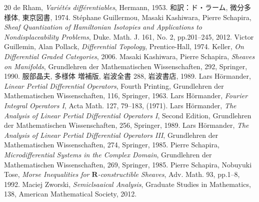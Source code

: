 \documentclass[leqno, 10pt, a4paper, dvipdfmx]{jsarticle}
\theoremstyle{definition}
\newcommand{\rr}{\mathbf{R}}
\numberwithin{equation}{section}
\theoremstyle{mystyle}
\begin{document}
\begin{thebibliography}{20} 
  de Rham, \textit{Vari\'et\'es diff\'erentiables}, Hermann, 1953.
  和訳：ド・ラーム, 微分多様体, 東京図書, 1974.
   St\'ephane Guillermou, 
  Masaki Kashiwara, Pierre Schapira, 
  \textit{Sheaf Quantization of Hamiltonian Isotopies and Applications to Nondisplaceability Problems}, 
  Duke. Math. J. 161, No. 2, pp.201--245, 2012.  
   Victor Guillemin, Alan Pollack, 
    \textit{Differential Topology}, 
    Prentice-Hall, 1974.
   Keller, \textit{On Differential Graded Categories}, 2006.
     Masaki Kashiwara, Pierre Schapira, 
    \textit{Sheaves on Manifolds}, 
    Grundlehren der Mathematischen Wissenschaften, 292, Springer, 1990.
   服部晶夫, 多様体 増補版, 岩波全書 288, 岩波書店, 1989.
   Lars H\"ormander, 
  \textit{Linear Pertial Differential Operators}, Fourth Printing, 
  Grundlehren der Mathematischen Wissenschaften, 116, Springer, 1963.
   Lars H\"ormander, 
  \textit{Fourier Integral Operators I}, 
  Acta Math. 127, 79--183, (1971).
   Lars H\"ormander, 
  \textit{The Analysis of Linear Pertial Differential Operators I}, Second Edition,
  Grundlehren der Mathematischen Wissenschaften, 256, Springer, 1989.
   Lars H\"ormander, 
  \textit{The Analysis of Linear Pertial Differential Operators III}, 
  Grundlehren der Mathematischen Wissenschaften, 274, Springer, 1985.
   Pierre Schapira, 
    \textit{Microdifferential Systems in the Complex Domain}, 
    Grundlehren der Mathematischen Wissenschaften, 269, 
    Springer, 1985.
     Pierre Schapira, Nobuyuki Tose, 
    \textit{Morse Inequalities for \(\rr\)-constructible Sheaves}, 
    Adv. Math. 93, pp.1--8, 1992. 
     Maciej Zworski,
    \textit{Semiclsaaical Analysis}, 
    Graduate Studies in Mathematics, 138, 
    American Mathematical Society, 
    2012. 
\end{thebibliography}

\end{document}
